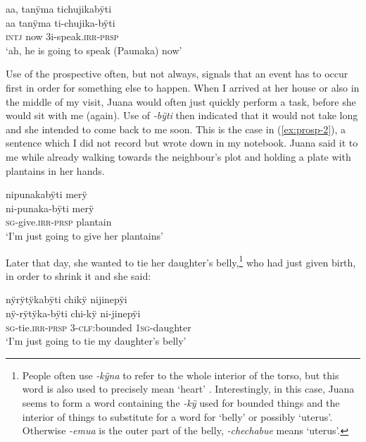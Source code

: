 \ea\label{ex:IMM-1}
\begingl 
\glpreamble aa, tanÿma tichujikabÿti\\
\gla  aa tanÿma ti-chujika-bÿti\\ 
\glb \textsc{intj} now 3i-speak.\textsc{irr}-\textsc{prsp}\\ 
\glft ‘ah, he is going to speak (Paunaka) now’\\ 
\endgl
\trailingcitation{[jmx-n120429ls-x5.150]}
\xe

Use of the prospective often, but not always, signals that an event has to occur first in order for something else to happen. When I arrived at her house or also in the middle of my visit, Juana would often just quickly perform a task, before she would sit with me (again). Use of \textit{-bÿti} then indicated that it would not take long and she intended to come back to me soon. This is the case in (\ref{ex:prosp-2}), a sentence which I did not record but wrote down in my notebook. Juana said it to me while already walking towards the neighbour’s plot and holding a plate with plantains in her hands.

\ea\label{ex:prosp-2}
\begingl
\glpreamble nipunakabÿti merÿ\\
\gla ni-punaka-bÿti merÿ\\
\textsc{sg}-give.\textsc{irr}-\textsc{prsp} plantain\\
\glft ‘I’m just going to give her plantains’
\endgl
\trailingcitation{[jxx-120430l-nr]}
\xe

Later that day, she wanted to tie her daughter’s belly,\footnote{People often use \textit{-kÿna} to refer to the whole interior of the torso, but this word is also used to precisely mean ‘heart’ \citep[cf.][]{TerhartDanielsenBODY}. Interestingly, in this case, Juana seems to form a word containing the  \textit{-kÿ} used for bounded things and the interior of things to substitute for a word for ‘belly’ or possibly ‘uterus’. Otherwise \textit{-emua} is the outer part of the belly, \textit{-chechabue} means ‘uterus’.} who had just given birth, in order to shrink it and she said:

\ea\label{ex:prosp-3}
\begingl
\glpreamble nÿrÿtÿkabÿti chikÿ nijinepÿi\\
\gla nÿ-rÿtÿka-bÿti chi-kÿ ni-jinepÿi\\
\textsc{sg}-tie.\textsc{irr}-\textsc{prsp} 3-\textsc{clf:}bounded 1\textsc{sg}-daughter\\
\glft ‘I’m just going to tie my daughter’s belly’
\endgl
\trailingcitation{[jxx-e120430l-2.1]}
\xe

